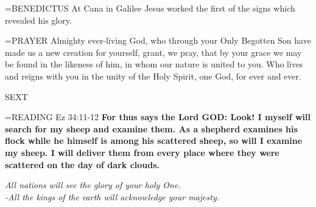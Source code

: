 \hangindent=\parindent \small{BENEDICTUS 	At Cana in Galilee Jesus worked the first of the signs which revealed his glory.\\}

\hangindent=\parindent \small{PRAYER 	Almighty ever-living God, who through your Only Begotten Son have made us a new creation for yourself, grant, we pray, that by your grace we may be found in the likeness of him, in whom our nature is united to you. Who lives and reigns with you in the unity of the Holy Spirit, one God, for ever and ever.}

\begin{flushleft}\normalsize SEXT\\\end{flushleft}

\hangindent=\parindent \small{READING}   Ez 34:11-12 \textbf{  For thus says the Lord GOD: Look! I myself will search for my sheep and examine them. As a shepherd examines his flock while he himself is among his scattered sheep, so will I examine my sheep. I will deliver them from every place where they were scattered on the day of dark clouds.}

\begin{center}
\textit{All nations will see the glory of your holy One.\\
-All the kings of the earth will acknowledge your majesty.}
\end{center}

